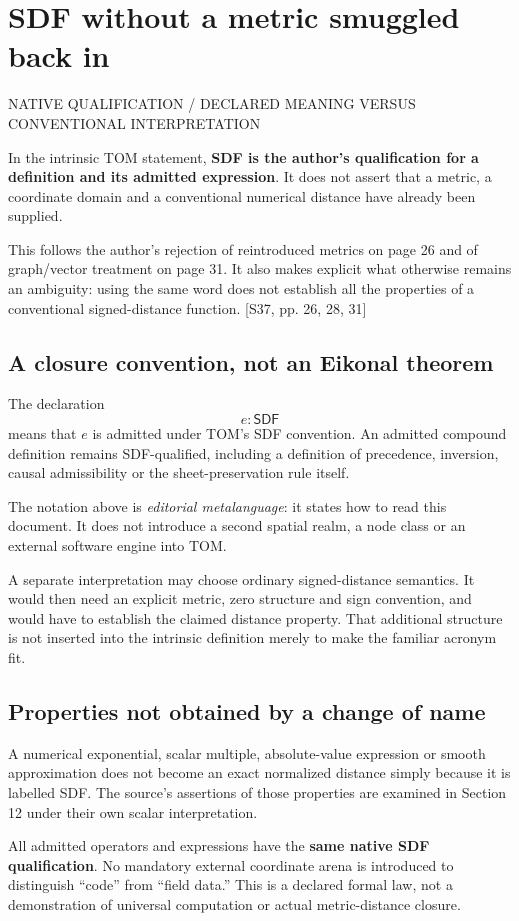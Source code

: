 \documentclass[11pt,a4paper]{article}
\newcommand{\newsec}[2]{\clearpage\section{#1}{\sffamily\footnotesize\color{teal}\MakeUppercase{#2}\par}\vspace{5pt}}
\newcommand{\src}[1]{{\small\color{muted}[S37, #1]}}
\newcommand{\sdf}{\mathsf{SDF}}
\begin{document}
\newsec{SDF without a metric smuggled back in}{Native qualification / declared meaning versus conventional interpretation}
In the intrinsic TOM statement, \textbf{SDF is the author's qualification for a definition and its admitted expression}. It does not assert that a metric, a coordinate domain and a conventional numerical distance have already been supplied.

This follows the author's rejection of reintroduced metrics on page 26 and of graph/vector treatment on page 31. It also makes explicit what otherwise remains an ambiguity: using the same word does not establish all the properties of a conventional signed-distance function. \src{pp. 26, 28, 31}

\subsection{A closure convention, not an Eikonal theorem}
The declaration
\[
 e:\sdf
\]
means that $e$ is admitted under TOM's SDF convention. An admitted compound definition remains SDF-qualified, including a definition of precedence, inversion, causal admissibility or the sheet-preservation rule itself.

The notation above is \emph{editorial metalanguage}: it states how to read this document. It does not introduce a second spatial realm, a node class or an external software engine into TOM.

A separate interpretation may choose ordinary signed-distance semantics. It would then need an explicit metric, zero structure and sign convention, and would have to establish the claimed distance property. That additional structure is not inserted into the intrinsic definition merely to make the familiar acronym fit.

\subsection{Properties not obtained by a change of name}
A numerical exponential, scalar multiple, absolute-value expression or smooth approximation does not become an exact normalized distance simply because it is labelled SDF. The source's assertions of those properties are examined in Section 12 under their own scalar interpretation.

\begin{boxx}
All admitted operators and expressions have the \textbf{same native SDF qualification}. No mandatory external coordinate arena is introduced to distinguish ``code'' from ``field data.'' This is a declared formal law, not a demonstration of universal computation or actual metric-distance closure.
\end{boxx}
\end{document}
